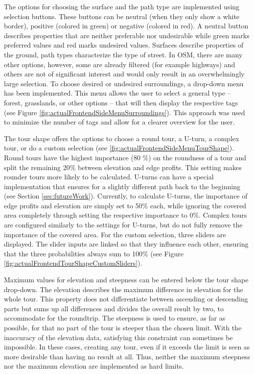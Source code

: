 The options for choosing the surface and the path type are implemented using selection buttons.
These buttons can be neutral (when they only show a white border), positive (colored in green) or negative (colored in red). 
A neutral button describes properties that are neither preferable nor undesirable while green marks preferred values and red marks undesired values.
Surfaces describe properties of the ground, path types characterize the type of street.
In OSM, there are many other options, however, some are already filtered (for example highways) and others are not of significant interest and would only result in an overwhelmingly large selection.
To choose desired or undesired surroundings, a drop-down menu has been implemented.
This menu allows the user to select a general type -- forest, grasslands, or other options -- that will then display the respective tags (see Figure \ref{fig:actualFrontendSideMenuSurroundings}). 
This approach was used to minimize the number of tags and allow for a clearer overview for the user.

The tour shape offers the options to choose a round tour, a U-turn, a complex tour, or do a custom selection (see \ref{fig:actualFrontendSideMenuTourShape}). 
Round tours have the highest importance (80 \%) on the roundness of a tour and split the remaining 20\% between elevation and edge profits. 
This setting makes rounder tours more likely to be calculated.
U-turns can have a special implementation that ensures for a slightly different path back to the beginning (see Section \ref{sec:futureWork}). Currently, to calculate U-turns, the importance of edge profits and elevation are simply set to 50\% each, while ignoring the covered area completely through setting the respective importance to 0\%.
Complex tours are configured similarly to the settings for U-turns, but do not fully remove the importance of the covered area. 
For the custom selection, three sliders are displayed.
The slider inputs are linked so that they influence each other, ensuring that the three probabilities always sum to 100\% (see Figure \ref{fig:actualFrontendTourShapeCustomSliders}).

Maximum values for elevation and steepness can be entered below the tour shape drop-down. 
The elevation describes the maximum difference in elevation for the whole tour. 
This property does not differentiate between ascending or descending parts but sums up all differences and divides the overall result by two, to accommodate for the roundtrip. 
The steepness is used to ensure, as far as possible, for that no part of the tour is steeper than the chosen limit.
With the inaccuracy of the elevation data, satisfying this constraint can sometimes be impossible.
In these cases, creating any tour, even if it exceeds the limit is seen as more desirable than having no result at all.
Thus, neither the maximum steepness nor the maximum elevation are implemented as hard limits.

